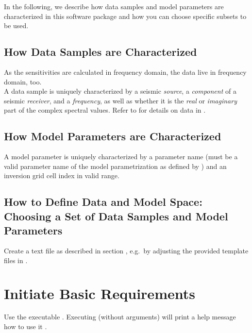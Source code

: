 In the following, we describe how data samples and model parameters are characterized in this software package and how you can 
choose specific subsets to be used. 
\subsection{How Data Samples are Characterized}
As the sensitivities are calculated in frequency domain, the data live in frequency domain, too.\\
A data sample is uniquely characterized by a seismic \emph{source}, a \emph{component} 
of a seismic \emph{receiver}, and a \emph{frequency}, as well as whether it is the \emph{real} or \emph{imaginary} part 
of the complex spectral values. Refer to  for details on data in \ASKI.
\subsection{How Model Parameters are Characterized} \label{basic_steps,sec:dmspace,sub:mparam}
A model parameter is uniquely  characterized by a parameter name (must be a valid parameter name of the model
parametrization as defined by  ) 
and an inversion grid cell index in valid range.
\subsection{How to Define Data and Model Space: Choosing a Set of Data Samples and Model Parameters}
Create a text file as described in section , e.g.\ by adjusting the provided
template files in .
%
\section{Initiate Basic Requirements} \label{basic_steps,sec:initBasics}
%
Use the executable . Executing  (without arguments) 
will print a help message how to use it .

